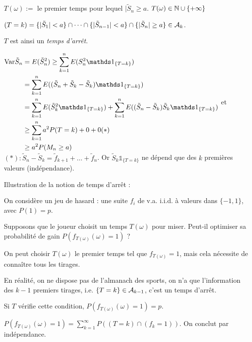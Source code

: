\documentclass[10pt,a4paper,notitlepage ]{report}
\begin{document}
\begin{demo}
	$T(\omega) :=$ le premier temps pour lequel $|\tilde S_n \ge a$. $T(\omega) \in \mathbb N \cup \{+\infty\}$
	
	$(T = k) = \{|\tilde S_1| < a \} \cap \dots \cap \{|\tilde S_{n-1}| < a \} \cap \{|\tilde S_n| \ge a \} \in \mathcal A_k$.
	
	$T$ est ainsi un \emph{temps d'arrêt}.
	
	$\begin{aligned}
		\var \tilde S_n &= E(\tilde S_n^2) \ge \sum_{k=1}^n E(S_n^2 \mathds 1_{\{T=k\}}) \\
		&= \sum_{k=1}^n E((\tilde S_n + \tilde S_k - \tilde S_k) \mathds 1_{\{T=k\}}) \\
		&= \sum_{k=1}^n E(\tilde S_k^2 \mathds 1_{\{T=k\}}) + \sum_{k=1}^n E((\tilde S_n - \tilde S_k)\tilde S_k \mathds 1_{\{T=k\}}) \\
		&\ge \sum_{k=1}^n a^2P(T=k) + 0 + 0 (*) \\
		&\ge a^2 P(M_n \ge a)
	\end{aligned}$
et $(*) : \tilde S_n - \tilde S_k = \tilde f_{k+1} + \dots + \tilde f_n$. Or $\tilde S_k \mathds 1_{\{T=k\}}$ ne dépend que des $k$ premières valeurs (indépendance).
\end{demo}

\begin{rem}
	Illustration de la notion de temps d'arrêt :
	
	On considère un jeu de hasard : une suite $f_i$ de v.a. i.i.d. à valeurs dans $\{-1, 1\}$, avec $P(1) =p$.
	
	Supposons que le joueur choisit un temps $T(\omega)$ pour miser. Peut-il optimiser sa probabilité de gain $P(f_{T(\omega)}(\omega) = 1)$ ?
	
	On peut choisir $T(\omega)$ le premier temps tel que $f_{T(\omega)} = 1$, mais cela nécessite de connaître tous les tirages.
	
	En réalité, on ne dispose pas de l'almanach des sports, on n'a que l'information des $k-1$ premiers tirages, i.e. $\{T=k\} \in \mathcal A_{k-1}$, c'est un temps d'arrêt.
	
	\begin{propriete}
		Si $T$ vérifie cette condition, $P(f_{T(\omega)}(\omega)=1) = p$.
	\end{propriete}
	\begin{demo}
		$P(f_{T(\omega)}(\omega)=1) = \sum_{k=1}^\infty P((T=k) \cap (f_k =1))$. On conclut par indépendance.
	\end{demo}
\end{rem}
\end{document}
